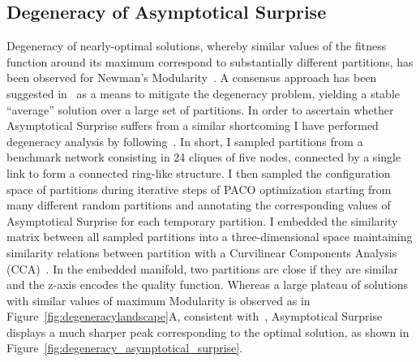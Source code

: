 \subsection{Degeneracy of Asymptotical Surprise}\label{sec:degeneracy_asymptotical_surprise}
Degeneracy of nearly-optimal solutions, whereby similar values of the fitness function around its maximum correspond to substantially different partitions, has been observed for Newman's Modularity~\cite{good2009}.
A consensus approach has been suggested in~\cite{lancichinetti2012} as a means to mitigate the degeneracy problem, yielding a stable ``average'' solution over a large set of partitions.
In order to ascertain whether Asymptotical Surprise suffers from a similar shortcoming I have performed degeneracy analysis by following~\cite{good2009}.
In short, I sampled partitions from a benchmark network consisting in 24 cliques of five nodes, connected by a single link to form a connected ring-like structure.
I then sampled the configuration space of partitions during iterative steps of PACO optimization starting from many different random partitions and annotating the corresponding values of Asymptotical Surprise for each temporary partition.
I embedded the similarity matrix between all sampled partitions into a three-dimensional space maintaining similarity relations between partition with a Curvilinear Components Analysis (CCA)~\cite{good2009}.
In the embedded manifold, two partitions are close if they are similar and the z-axis encodes the quality function.
Whereas a large plateau of solutions with similar values of maximum Modularity is observed as in Figure~\ref{fig:degeneracylandscape}A, consistent with~\cite{good2009}, Asymptotical Surprise displays a much sharper peak corresponding to the optimal solution, as shown in Figure~\ref{fig:degeneracy_asymptotical_surprise}.

